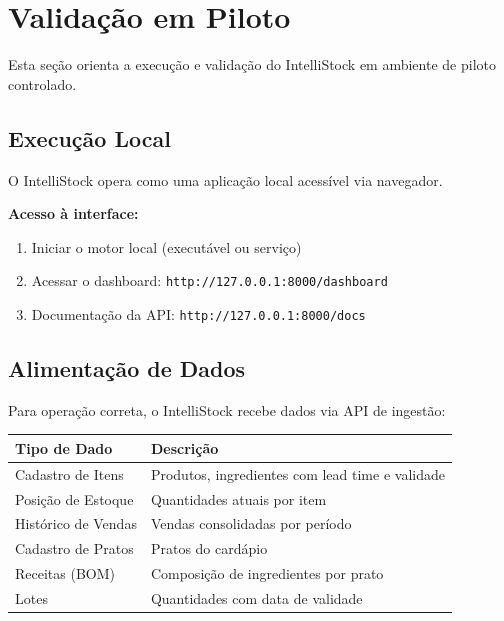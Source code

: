 
\section{Validação em Piloto}

Esta seção orienta a execução e validação do IntelliStock em ambiente
de piloto controlado.

\subsection{Execução Local}

O IntelliStock opera como uma aplicação local acessível via navegador.

\textbf{Acesso à interface:}

\begin{enumerate}[leftmargin=2em]
  \item Iniciar o motor local (executável ou serviço)
  \item Acessar o dashboard: \texttt{http://127.0.0.1:8000/dashboard}
  \item Documentação da API: \texttt{http://127.0.0.1:8000/docs}
\end{enumerate}

\subsection{Alimentação de Dados}

Para operação correta, o IntelliStock recebe dados via API de ingestão:

\begin{center}
\begin{tabular}{l p{8cm}}
\toprule
\textbf{Tipo de Dado} & \textbf{Descrição} \\
\midrule
Cadastro de Itens     & Produtos, ingredientes com lead time e validade \\
Posição de Estoque    & Quantidades atuais por item \\
Histórico de Vendas   & Vendas consolidadas por período \\
Cadastro de Pratos    & Pratos do cardápio \\
Receitas (BOM)        & Composição de ingredientes por prato \\
Lotes                 & Quantidades com data de validade \\
\bottomrule
\end{tabular}
\end{center}

